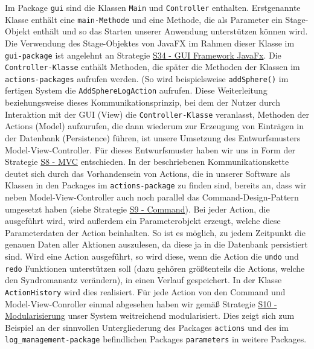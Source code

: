 \documentclass[enabledeprecatedfontcommands,fontsize=11pt,paper=a4,twoside]{scrartcl}
\newcounter{one}
\begin{document}
\newpage


Im Package \texttt{gui} sind die Klassen \texttt{Main} und \texttt{Controller} enthalten. Erstgenannte Klasse enthält eine \texttt{main-Methode} und eine Methode, die als Parameter ein Stage-Objekt enthält und so das Starten unserer Anwendung unterstützen können wird. Die Verwendung des Stage-Objektes von JavaFX im Rahmen dieser Klasse im \texttt{gui-package} ist angelehnt an Strategie \hyperlink{kkk}{S34 - GUI Framework JavaFx}. Die \texttt{Controller-Klasse} enthält Methoden, die später die Methoden der Klassen im \texttt{actions-packages} aufrufen werden. (So wird beispielsweise \texttt{addSphere()} im fertigen System die \texttt{AddSphereLogAction} aufrufen. Diese Weiterleitung beziehungsweise dieses Kommunikationsprinzip, bei dem der Nutzer durch Interaktion mit der GUI (View) die \texttt{Controller-Klasse} veranlasst, Methoden der Actions (Model) aufzurufen, die dann wiederum zur Erzeugung von Einträgen in der Datenbank (Persistence) führen, ist unsere Umsetzung des Entwurfsmusters Model-View-Controller. Für dieses Entwurfsmuster haben wir uns in Form der Strategie \hyperlink{bbb}{S8 - MVC} entschieden. In der beschriebenen Kommunikationskette deutet sich durch das Vorhandensein von Actions, die in unserer Software als Klassen in den Packages im \texttt{actions-package} zu finden sind, bereits an, dass wir neben Model-View-Controller auch noch parallel das Command-Design-Pattern umgesetzt haben (siehe Strategie \hyperlink{xcc}{S9 - Command}). Bei jeder Action, die ausgeführt wird, wird außerdem ein Parameterobjekt erzeugt, welche diese Parameterdaten der Action beinhalten. So ist es möglich, zu jedem Zeitpunkt die genauen Daten aller Aktionen auszulesen, da diese ja in die Datenbank persistiert sind. Wird eine Action ausgeführt, so wird diese, wenn die Action die \texttt{undo} und \texttt{redo} Funktionen unterstützen soll (dazu gehören größtenteils die Actions, welche den Syndromansatz verändern), in einen Verlauf gespeichert. In der Klasse \texttt{ActionHistory} wird dies realisiert. Für jede Action von den Command und Model-View-Conroller einmal abgesehen haben wir gemäß Strategie \hyperlink{xdd}{S10 - Modularisierung} unser System weitreichend modularisiert. Dies zeigt sich zum Beispiel an der sinnvollen Untergliederung des Packages \texttt{actions} und des im \texttt{log\_management-package} befindlichen Packages \texttt{parameters} in weitere Packages.\\ \\
\end{document}
